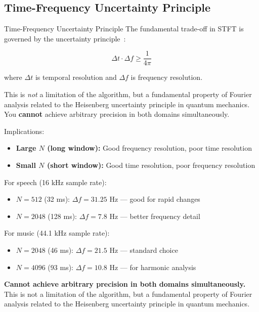 \subsection{Time-Frequency Uncertainty Principle}\label{subsec:uncertainty}

\begin{concept}{Time-Frequency Uncertainty Principle}
  The fundamental trade-off in STFT is governed by the uncertainty
  principle~\cite{gabor1946theory}:

  \begin{equation}
    \label{eq:uncertainty_principle}
    \Delta t \cdot \Delta f \geq \frac{1}{4\pi}
  \end{equation}

  where $\Delta t$ is temporal resolution and $\Delta f$ is frequency
  resolution.

  This is \emph{not} a limitation of the algorithm, but a fundamental
  property of Fourier analysis related to the Heisenberg uncertainty
  principle in quantum mechanics. You \textbf{cannot} achieve
  arbitrary precision in both domains simultaneously.
\end{concept}

Implications:
\begin{itemize}[itemsep=3pt]
  \item \textbf{Large $N$ (long window):} Good frequency resolution,
    poor time resolution
  \item \textbf{Small $N$ (short window):} Good time resolution, poor
    frequency resolution
\end{itemize}

For speech (16 kHz sample rate):
\begin{itemize}
  \item $N = 512$ (32 ms): $\Delta f = 31.25$ Hz --- good for rapid changes
  \item $N = 2048$ (128 ms): $\Delta f = 7.8$ Hz --- better frequency detail
\end{itemize}

For music (44.1 kHz sample rate):
\begin{itemize}
  \item $N = 2048$ (46 ms): $\Delta f = 21.5$ Hz --- standard choice
  \item $N = 4096$ (93 ms): $\Delta f = 10.8$ Hz --- for harmonic analysis
\end{itemize}

\textbf{Cannot achieve arbitrary precision in both domains
simultaneously.} This is not a limitation of the algorithm, but a
fundamental property of Fourier analysis related to the Heisenberg
uncertainty principle in quantum mechanics.

